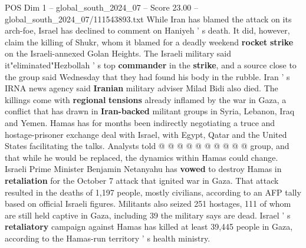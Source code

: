 \begin{textsample}{POS Dim 1 – global\_south\_2024\_07 – Score 23.00 – global\_south\_2024\_07/111543893.txt}
While Iran has blamed the attack on its arch-foe, Israel has declined to comment on Haniyeh ' s death.
It did, however, claim the killing of Shukr, whom it blamed for a deadly weekend \textbf{rocket} \textbf{strike} on the Israeli-annexed Golan Heights.
The Israeli military said it"eliminated"Hezbollah ' s top \textbf{commander} in the \textbf{strike}, and a source close to the group said Wednesday that they had found his body in the rubble.
Iran ' s IRNA news agency said \textbf{Iranian} military adviser Milad Bidi also died.
The killings come with \textbf{regional} \textbf{tensions} already inflamed by the war in Gaza, a conflict that has drawn in \textbf{Iran-backed} militant groups in Syria, Lebanon, Iraq and Yemen.
Hamas has for months been indirectly negotiating a truce and hostage-prisoner exchange deal with Israel, with Egypt, Qatar and the United States facilitating the talks.
Analysts told @ @ @ @ @ @ @ @ @ @ group, and that while he would be replaced, the dynamics within Hamas could change.
Israeli Prime Minister Benjamin Netanyahu has \textbf{vowed} to destroy Hamas in \textbf{retaliation} for the October 7 attack that ignited war in Gaza.
That attack resulted in the deaths of 1,197 people, mostly civilians, according to an AFP tally based on official Israeli figures.
Militants also seized 251 hostages, 111 of whom are still held captive in Gaza, including 39 the military says are dead.
Israel ' s \textbf{retaliatory} campaign against Hamas has killed at least 39,445 people in Gaza, according to the Hamas-run territory ' s health ministry.

\end{textsample}
